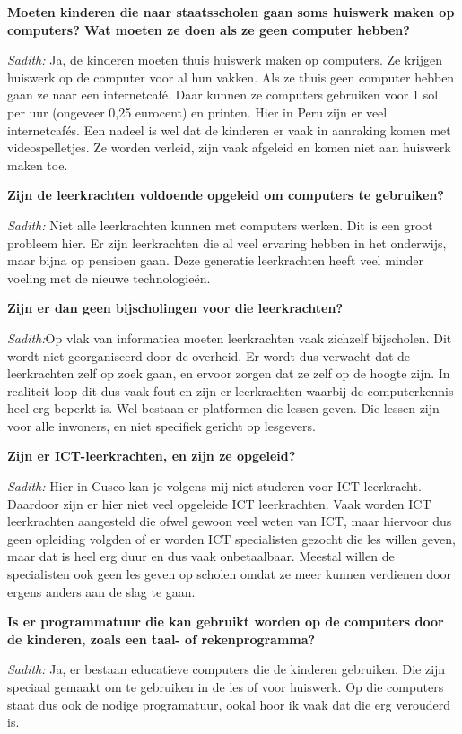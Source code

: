 \textbf{Moeten kinderen die naar staatsscholen gaan soms huiswerk maken op computers? Wat moeten ze doen als ze geen computer hebben?}

\textit{Sadith:} Ja, de kinderen moeten thuis huiswerk maken op computers. Ze krijgen huiswerk op de computer voor al hun vakken. Als ze thuis geen computer hebben gaan ze naar een internetcafé. Daar kunnen ze computers gebruiken voor 1 sol per uur (ongeveer 0,25 eurocent) en printen. Hier in Peru zijn er veel internetcafés. Een nadeel is wel dat de kinderen er vaak in aanraking komen met videospelletjes. Ze worden verleid, zijn vaak afgeleid en komen niet aan huiswerk maken toe. 

\textbf{Zijn de leerkrachten voldoende opgeleid om computers te gebruiken?}

\textit{Sadith:} Niet alle leerkrachten kunnen met computers werken. Dit is een groot probleem hier. Er zijn leerkrachten die al veel ervaring hebben in het onderwijs, maar bijna op pensioen gaan. Deze generatie leerkrachten heeft veel minder voeling met de nieuwe technologieën.

\textbf{Zijn er dan geen bijscholingen voor die leerkrachten?}

\textit{Sadith:}Op vlak van informatica moeten leerkrachten vaak zichzelf bijscholen. Dit wordt niet georganiseerd door de overheid. Er wordt dus verwacht dat de leerkrachten zelf op zoek gaan, en ervoor zorgen dat ze zelf op de hoogte zijn. In realiteit loop dit dus vaak fout en zijn er leerkrachten waarbij de computerkennis heel erg beperkt is. Wel bestaan er platformen die lessen geven. Die lessen zijn voor alle inwoners, en niet specifiek gericht op lesgevers.

\textbf{Zijn er ICT-leerkrachten, en zijn ze opgeleid?}

\textit{Sadith:} Hier in Cusco kan je volgens mij niet studeren voor ICT leerkracht. Daardoor zijn er hier niet veel opgeleide ICT leerkrachten. Vaak worden ICT leerkrachten aangesteld die ofwel gewoon veel weten van ICT, maar hiervoor dus geen opleiding volgden of er worden ICT specialisten gezocht die les willen geven, maar dat is heel erg duur en dus vaak onbetaalbaar. Meestal willen de specialisten ook geen les geven op scholen omdat ze meer kunnen verdienen door ergens anders aan de slag te gaan. 

\textbf{Is er programmatuur die kan gebruikt worden op de computers door de kinderen, zoals een taal- of rekenprogramma?}

\textit{Sadith:} Ja, er bestaan educatieve computers die de kinderen gebruiken. Die zijn speciaal gemaakt om te gebruiken in de les of voor huiswerk. Op die computers staat dus ook de nodige programatuur, ookal hoor ik vaak dat die erg verouderd is.
	
